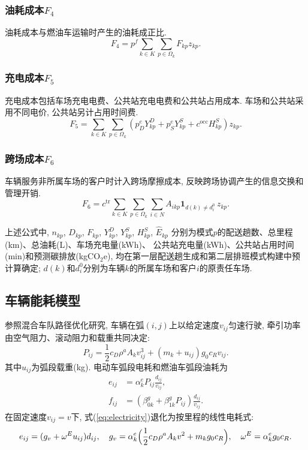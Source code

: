 \documentclass{setp-new}
\begin{document}
\subsubsection{油耗成本$F_4$}
油耗成本与燃油车运输时产生的油耗成正比.
\begin{equation}
F_4=p^f\sum_{k\in K}\sum_{p\in\Omega_k}F_{kp}z_{kp}.
\label{eq:F4}
\end{equation}

\subsubsection{充电成本$F_5$}
充电成本包括车场充电电费、公共站充电电费和公共站占用成本.
车场和公共站采用不同电价, 公共站另计占用时间费.
\begin{equation}
F_5=\sum_{k\in K}\sum_{p\in\Omega_k}(p_D^eY_{kp}^D+p_S^eY_{kp}^S+c^{\mathrm{occ}}H_{kp}^S)z_{kp}.
\label{eq:F5}
\end{equation}

\subsubsection{跨场成本$F_6$}
车辆服务非所属车场的客户时计入跨场摩擦成本,
反映跨场协调产生的信息交换和管理开销.
\begin{equation}
F_6=c^{\mathrm{tr}}\sum_{k\in K}\sum_{p\in\Omega_k}\sum_{i\in N}A_{ikp}\mathbf 1_{d(k)\neq d_i^0}\,z_{kp}.
\label{eq:F6}
\end{equation}

上述公式中, $n_{kp}$, $D_{kp}$, $F_{kp}$, $Y_{kp}^D$, $Y_{kp}^S$, $H_{kp}^S$, $\widehat E_{kp}$
分别为模式$p$的配送趟数、总里程(km)、总油耗(L)、车场充电量(kWh)、
公共站充电量(kWh)、公共站占用时间(min)和预测碳排放(kgCO$_2$e),
均在第一层配送趟生成和第二层排班模式构建中预计算确定;
$d(k)$和$d_i^0$分别为车辆$k$的所属车场和客户$i$的原责任车场.

\subsection{车辆能耗模型}

参照混合车队路径优化研究\cite{ref:27},
车辆在弧$(i,j)$上以给定速度$v_{ij}$匀速行驶,
牵引功率由空气阻力、滚动阻力和载重共同决定:
\begin{equation}
P_{ij}=\frac12c_D\rho^a A_k v_{ij}^3+(m_k+u_{ij})g_0c_R v_{ij}.
\label{eq:power}
\end{equation}
其中$u_{ij}$为弧段载重(kg).
电动车弧段电耗和燃油车弧段油耗为
\begin{align}
e_{ij}&=\alpha_k^e P_{ij}\frac{d_{ij}}{v_{ij}}, \label{eq:electricity}\\
f_{ij}&=(\beta_{0k}^g+\beta_{1k}^gP_{ij})\frac{d_{ij}}{v_{ij}}. \label{eq:fuel}
\end{align}
在固定速度$v_{ij}=v$下, 式(\ref{eq:electricity})退化为按里程的线性电耗式:
\begin{equation}
e_{ij}=(g_v+\omega^E u_{ij})d_{ij},\quad
g_v=\alpha_k^e\Bigl(\frac12c_D\rho^a A_k v^2+m_k g_0 c_R\Bigr),\quad
\omega^E=\alpha_k^e g_0 c_R.
\label{eq:linear_energy}
\end{equation}
\end{document}
